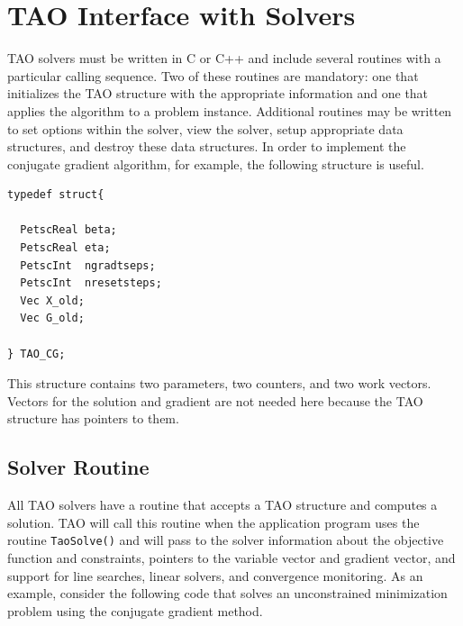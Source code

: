 \documentclass[]{book}
\begin{document}
\section{TAO Interface with Solvers}
TAO solvers must be written in C or C++ and include several routines with
a particular calling sequence.  Two of these routines are mandatory:
one that initializes the TAO structure with the appropriate information
and one that applies the algorithm to a problem instance.
Additional routines may be written to set options within the
solver, view the solver, setup appropriate data structures, and destroy
these data structures. In order to implement the conjugate
gradient algorithm, for example, the following structure is
useful.
\begin{verbatim}
typedef struct{

  PetscReal beta;
  PetscReal eta;
  PetscInt  ngradtseps;
  PetscInt  nresetsteps;
  Vec X_old;
  Vec G_old; 

} TAO_CG;
\end{verbatim}
This structure contains two parameters, two counters, and two work vectors.
Vectors
for the solution and gradient are not needed here because the TAO
structure has pointers to them.


\subsection{Solver Routine}
All TAO solvers have a routine that accepts a TAO structure and
computes a solution.  
TAO will call this routine when the application
program uses the routine {\tt TaoSolve()} and will pass to the solver
information
about the objective function and constraints, pointers to the
variable vector and gradient vector, and support for line searches,
linear solvers, and convergence monitoring.  As an example, consider
the following code that solves an unconstrained minimization problem
using the conjugate gradient method.
\end{document}
